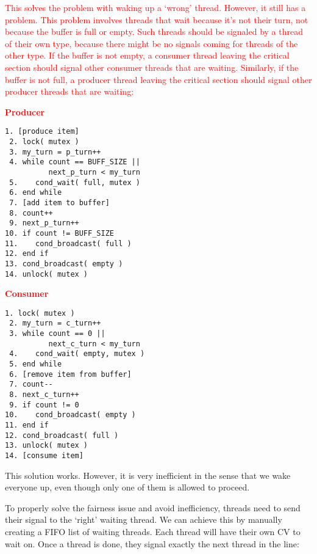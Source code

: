 \textcolor{red}{
This solves the problem with waking up a `wrong' thread.
However, it still has a problem.
This problem involves threads that wait because it's not their turn, not because the buffer is full or empty.
Such threads should be signaled by a thread of their own type, because there might be no signals coming for threads of the other type.
If the buffer is not empty, a consumer thread leaving the critical section should signal other consumer threads that are waiting.
Similarly, if the buffer is not full, a producer thread leaving the critical section should signal other producer threads that are waiting:}

\begin{multicols}{2}
    \small
    \textcolor{red}{\textbf{Producer}}\vspace{-2em}
    \begin{Verbatim}[formatcom=\color{red}]
 1. [produce item]
 2. lock( mutex )
 3. my_turn = p_turn++
 4. while count == BUFF_SIZE ||
          next_p_turn < my_turn
 5.    cond_wait( full, mutex )
 6. end while
 7. [add item to buffer]
 8. count++
 9. next_p_turn++
10. if count != BUFF_SIZE
11.    cond_broadcast( full )
12. end if
13. cond_broadcast( empty )
14. unlock( mutex )
    \end{Verbatim}
    \columnbreak
    \textcolor{red}{\textbf{Consumer}}\vspace{-2em}
    \begin{Verbatim}[formatcom=\color{red}]
 1. lock( mutex )
 2. my_turn = c_turn++
 3. while count == 0 ||
          next_c_turn < my_turn
 4.    cond_wait( empty, mutex )
 5. end while
 6. [remove item from buffer]
 7. count--
 8. next_c_turn++
 9. if count != 0
10.    cond_broadcast( empty )
11. end if
12. cond_broadcast( full )
13. unlock( mutex )
14. [consume item]
    \end{Verbatim}
\end{multicols}
\vspace{-2em}


This solution works.
However, it is very inefficient in the sense that we wake everyone up, even though only one of them is allowed to proceed.

To properly solve the fairness issue and avoid inefficiency, threads need to send their signal to the `right' waiting thread.
We can achieve this by manually creating a FIFO list of waiting threads.
Each thread will have their own CV to wait on.
Once a thread is done, they signal exactly the next thread in the line:

